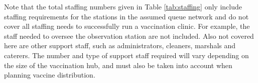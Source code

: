 \documentclass{article}
\begin{document}
\begin{table}[!h]

\caption{\label{tab:staffing}Staff numbers by station for low, medium and high staffing availability}
\end{table}

Note that the total staffing numbers given in Table \ref{tab:staffing}
only include staffing requirements for the stations in the assumed queue
network and do not cover all staffing needs to successfully run a
vaccination clinic. For example, the staff needed to oversee the
observation station are not included. Also not covered here are other
support staff, such as administrators, cleaners, marshals and caterers.
The number and type of support staff required will vary depending on the
size of the vaccination hub, and must also be taken into account when
planning vaccine distribution.
\end{document}
